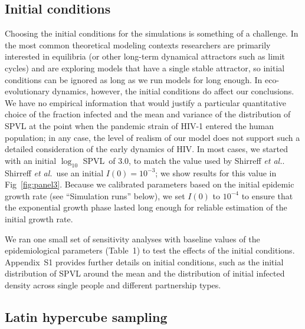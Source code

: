 \documentclass[10pt,letterpaper]{article}
\renewcommand{\figurename}{Fig}
\newcommand{\Lspvl}{$\log_{10}$ SPVL}
\newcommand{\etal}{\textit{et al.}}
\begin{document}
\subsection*{Initial conditions}

Choosing the initial conditions for the simulations is something of a
challenge. In the most common theoretical modeling contexts
researchers are primarily interested in equilibria (or other long-term
dynamical attractors such as limit cycles) and are exploring models
that have a single stable attractor, so initial conditions can be
ignored as long as we run models for long enough.  In eco-evolutionary
dynamics, however, the initial conditions do affect our
conclusions. We have no empirical information that would justify a
particular quantitative choice of the fraction infected and the mean
and variance of the distribution of SPVL at the point when the
pandemic strain of HIV-1 entered the human population; in any case,
the level of realism of our model does not support such a detailed
consideration of the early dynamics of HIV.  In most cases, we started
with an initial \Lspvl\ of 3.0, to match the value used by
Shirreff \etal. Shirreff \etal\ use an initial $I(0)=10^{-3}$;
we show results for this value in \figurename~\ref{fig:panel3}.
Because we calibrated parameters based on the initial epidemic growth rate
(see ``Simulation runs'' below), we set $I(0)$ to $10^{-4}$ to ensure
that the exponential growth phase lasted long enough for reliable
estimation of the initial growth rate.

We ran one small set of sensitivity analyses with baseline values of the
epidemiological parameters (Table~1) to test the effects of the
initial conditions. Appendix~S1 provides
further details on initial conditions, such
as the initial distribution of SPVL around the mean and the
distribution of initial infected density across single people
and different partnership types.

\subsection*{Latin hypercube sampling}
\end{document}
